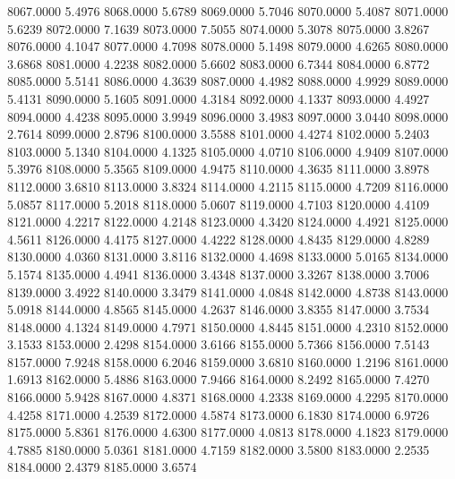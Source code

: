 8067.0000      5.4976
8068.0000      5.6789
8069.0000      5.7046
8070.0000      5.4087
8071.0000      5.6239
8072.0000      7.1639
8073.0000      7.5055
8074.0000      5.3078
8075.0000      3.8267
8076.0000      4.1047
8077.0000      4.7098
8078.0000      5.1498
8079.0000      4.6265
8080.0000      3.6868
8081.0000      4.2238
8082.0000      5.6602
8083.0000      6.7344
8084.0000      6.8772
8085.0000      5.5141
8086.0000      4.3639
8087.0000      4.4982
8088.0000      4.9929
8089.0000      5.4131
8090.0000      5.1605
8091.0000      4.3184
8092.0000      4.1337
8093.0000      4.4927
8094.0000      4.4238
8095.0000      3.9949
8096.0000      3.4983
8097.0000      3.0440
8098.0000      2.7614
8099.0000      2.8796
8100.0000      3.5588
8101.0000      4.4274
8102.0000      5.2403
8103.0000      5.1340
8104.0000      4.1325
8105.0000      4.0710
8106.0000      4.9409
8107.0000      5.3976
8108.0000      5.3565
8109.0000      4.9475
8110.0000      4.3635
8111.0000      3.8978
8112.0000      3.6810
8113.0000      3.8324
8114.0000      4.2115
8115.0000      4.7209
8116.0000      5.0857
8117.0000      5.2018
8118.0000      5.0607
8119.0000      4.7103
8120.0000      4.4109
8121.0000      4.2217
8122.0000      4.2148
8123.0000      4.3420
8124.0000      4.4921
8125.0000      4.5611
8126.0000      4.4175
8127.0000      4.4222
8128.0000      4.8435
8129.0000      4.8289
8130.0000      4.0360
8131.0000      3.8116
8132.0000      4.4698
8133.0000      5.0165
8134.0000      5.1574
8135.0000      4.4941
8136.0000      3.4348
8137.0000      3.3267
8138.0000      3.7006
8139.0000      3.4922
8140.0000      3.3479
8141.0000      4.0848
8142.0000      4.8738
8143.0000      5.0918
8144.0000      4.8565
8145.0000      4.2637
8146.0000      3.8355
8147.0000      3.7534
8148.0000      4.1324
8149.0000      4.7971
8150.0000      4.8445
8151.0000      4.2310
8152.0000      3.1533
8153.0000      2.4298
8154.0000      3.6166
8155.0000      5.7366
8156.0000      7.5143
8157.0000      7.9248
8158.0000      6.2046
8159.0000      3.6810
8160.0000      1.2196
8161.0000      1.6913
8162.0000      5.4886
8163.0000      7.9466
8164.0000      8.2492
8165.0000      7.4270
8166.0000      5.9428
8167.0000      4.8371
8168.0000      4.2338
8169.0000      4.2295
8170.0000      4.4258
8171.0000      4.2539
8172.0000      4.5874
8173.0000      6.1830
8174.0000      6.9726
8175.0000      5.8361
8176.0000      4.6300
8177.0000      4.0813
8178.0000      4.1823
8179.0000      4.7885
8180.0000      5.0361
8181.0000      4.7159
8182.0000      3.5800
8183.0000      2.2535
8184.0000      2.4379
8185.0000      3.6574
